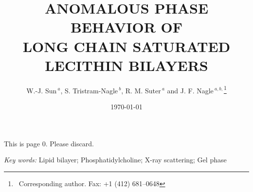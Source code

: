 
%
%


\begin{titlepage}
\title{ANOMALOUS PHASE BEHAVIOR OF\protect\\
LONG CHAIN SATURATED LECITHIN BILAYERS
}
\author{W.-J. Sun$^{\ a}$, S. Tristram-Nagle$^{\ b}$, R. M. Suter$^{\ a}$ and 
J. F. Nagle$^{\ a,b,}$\footnote{\ Corresponding author. Fax: +1 (412) 681--0648}}
\address{$^{\ a}$Departments of Physics and $^{\ b}$Biological Sciences,
\protect\\
 Carnegie Mellon University , Pittsburgh, PA 15213
}
\date{\today}
This is page 0. Please discard.
\maketitle
\vspace{360pt}
\begin{flushleft}
\textit{Key words:} Lipid bilayer; Phosphatidylcholine; X-ray scattering;
Gel phase
\end{flushleft}
\end{titlepage}
